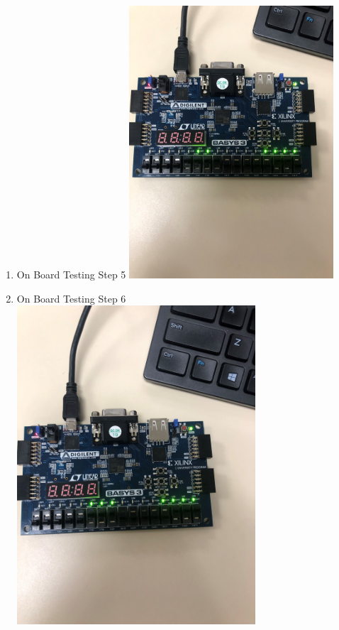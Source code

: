 \documentclass[11pt]{article}
\begin{document}
\begin{enumerate}
\item On Board Testing Step 5 
\includegraphics[width=0.6\textwidth, angle=270]{Lab9.5.jpg} \centering
\label{fig:On Board testing Step 5}

\item On Board Testing Step 6 
\includegraphics[width=0.7\textwidth, angle=270]{Lab9.6.jpg} \centering
\label{fig:On Board testing Step 6}


\end{enumerate}
\end{document}
